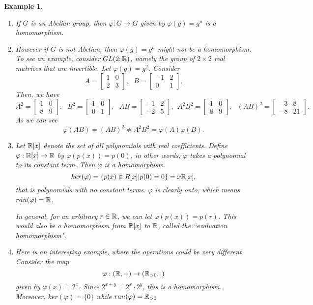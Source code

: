 \documentclass[12pt]{article}
\theoremstyle{plain}
\newtheorem{example}{Example}
\theoremstyle{definition}
\theoremstyle{remark}
\begin{document}
\begin{example}
\begin{enumerate}
 $$ker(\varphi) = \{m\in \Z| m\equiv 0\pmod{n}\} = n\Z,$$
 while $ran(\varphi) = \Z_n$.
 \item If $G$ is an Abelian group, then $\varphi:G\rightarrow G$ given by $\varphi(g)=g^n$ is a homomorphism.
 \item However if $G$ is not Abelian, then $\varphi(g)=g^n$ might not be a homomorphism. To see an example, consider $GL(2;\mathbb{R})$, namely the group of $2\times 2$ real matrices that are invertible. Let $\varphi(g)=g^2$.
 Consider
 $$ A=\begin{bmatrix}
    1&0\\
    2&3    \end{bmatrix}, \:\:\: B = \begin{bmatrix}
    -1&2\\
    0&1    \end{bmatrix}.$$
    Then, we have
    $$A^2 = \begin{bmatrix}
    1&0\\
    8&9    \end{bmatrix}, \:\:\: B^2 = \begin{bmatrix}
    1&0\\
    0&1    \end{bmatrix}, \:\:\: AB = \begin{bmatrix}
    -1&2\\
    -2&5    \end{bmatrix}, \:\: A^2B^2 = \begin{bmatrix}
    1&0\\
    8&9    \end{bmatrix}, \:\:\: (AB)^2 = \begin{bmatrix}
    -3&8\\
    -8&21    \end{bmatrix}.$$
    As we can see $$\varphi(AB) = (AB)^2 \neq A^2B^2 =\varphi(A)\varphi(B).$$
\item Let $\mathbb{R}[x]$ denote the set of all polynomials with real coefficients. Define $\varphi:\mathbb{R}[x]\rightarrow \mathbb{R}$ by $\varphi(p(x)) = p(0)$, in other words, $\varphi$ takes a polynomial to its constant term. Then $\varphi$ is a homomorphism.
$$ker(\varphi) = \{p(x) \in R[x]|p(0)=0\} = x\mathbb{R}[x],$$
that is polynomials with no constant terms. $\varphi$ is clearly onto, which means $ran(\varphi)=\mathbb{R}$.

In general, for an arbitrary $r\in \mathbb{R}$, we can let $\varphi(p(x)) = p(r)$. This would also be a homomorphism from $\mathbb{R}[x]$ to $\mathbb{R}$, called the ``evaluation homomorphism".  \item Here is an interesting example, where the operations could be very different. Consider the map
$$\varphi: \left( \mathbb{R}, +\right) \rightarrow  \left (\mathbb{R}_{>0}, \cdot \right )$$ given by
$\varphi(x)=2^x$. Since $2^{x+y} = 2^x\cdot 2^y$, this is a homomorphism. Moreover, $ker(\varphi) = \{0\}$ while $ran(\varphi) = \mathbb{R}_{>0}$
  \end{enumerate}
\end{example}
\end{document}
